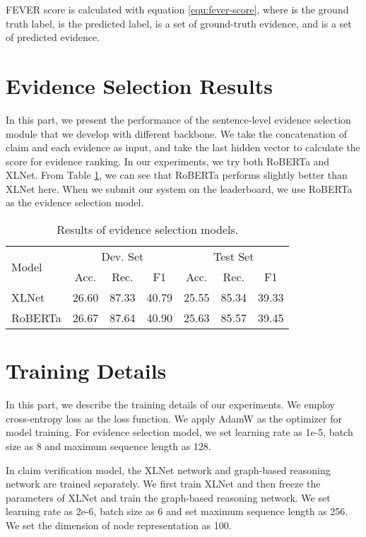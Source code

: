 \documentclass[11pt,a4paper]{article}
\begin{document}
FEVER score is calculated with equation \ref{equ:fever-score}, where 
 is the ground truth label,  is the predicted label, 
 is a set of ground-truth evidence,  and  is a set of predicted evidence.








\section{Evidence Selection Results}
\label{appendix:evidence-selection}
In this part, we present the performance of the sentence-level evidence selection module that we develop with different backbone. 
We take the concatenation of claim and each evidence as input, and take the last hidden vector to calculate the score for evidence ranking. 
In our experiments, we try both RoBERTa and XLNet. 
From Table \ref{tab:evidence-table}, we can see that RoBERTa performs slightly better than XLNet here. When we submit our system on the leaderboard, we use RoBERTa as the evidence selection model.
\begin{table}[h]
	\small
	\begin{tabular}{l|ccc|ccc}
		\hline
		\multirow{2}{*}{Model} & \multicolumn{3}{c|}{Dev. Set} & \multicolumn{3}{c}{Test Set} \\ \cline{2-7} 
		& Acc.     & Rec.    & F1    & Acc.     & Rec.    & F1    \\ \hline
		XLNet       &   26.60       &   87.33  & 40.79   &  25.55 & 85.34 & 39.33 \\
		RoBERTa      & 26.67 & 87.64 &  40.90 & 25.63 & 85.57 & 39.45 \\ \hline
	\end{tabular}
	\caption{Results of evidence selection models.}
	\label{tab:evidence-table}
\end{table}

\section{Training Details}
In this part, we describe the
training details of our experiments. We employ cross-entropy loss as the loss function. We apply AdamW as the optimizer for model training. 
For evidence selection model, we set learning rate as 1e-5, batch size as 8 and maximum sequence length as 128.

In claim verification model, the XLNet network and graph-based reasoning network are trained separately. We first train XLNet and then freeze the parameters of XLNet and train the graph-based reasoning network. We set learning rate as 2e-6, batch size as 6 and set maximum sequence length as 256. We set the dimension of node representation as 100. 
\end{document}
